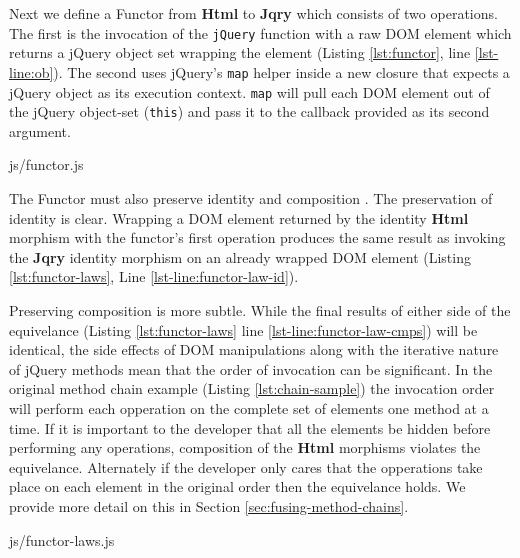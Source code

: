 \documentclass[preprint, leqno]{sigplanconf}
\begin{document}
Next we define a Functor from \textbf{Html} to \textbf{Jqry} which consists of two operations. The first is the invocation of the \verb|jQuery| function with a raw DOM element which returns a jQuery object set wrapping the element (Listing \ref{lst:functor}, line \ref{lst-line:ob}). The second uses jQuery's \verb|map| helper inside a new closure that expects a jQuery object as its execution context. \verb|map| will pull each DOM element out of the jQuery object-set (\verb|this|) and pass it to the callback provided as its second argument.

\begin{bottom}
\begin{lstinputlisting}[
    language=JavaScript,
    caption={Functor from Html to Jqry},
    label={lst:functor},
    escapeinside={@}{@}
]{js/functor.js}
\end{lstinputlisting}
\end{bottom}

The Functor must also preserve identity and composition \cite[p. ~36]{bib:category-definition}. The preservation of identity is clear. Wrapping a DOM element returned by the identity \textbf{Html} morphism with the functor's first operation produces the same result as invoking the \textbf{Jqry} identity morphism on an already wrapped DOM element (Listing \ref{lst:functor-laws}, Line \ref{lst-line:functor-law-id}).

Preserving composition is more subtle. While the final results of either side of the equivelance (Listing \ref{lst:functor-laws} line \ref{lst-line:functor-law-cmps}) will be identical, the side effects of DOM manipulations along with the iterative nature of jQuery methods mean that the order of invocation can be significant. In the original method chain example (Listing \ref{lst:chain-sample}) the invocation order will perform each opperation on the complete set of elements one method at a time.  If it is important to the developer that all the elements be hidden before performing any operations, composition of the \textbf{Html} morphisms violates the equivelance. Alternately if the developer only cares that the opperations take place on each element in the original order then the equivelance holds. We provide more detail on this in Section \ref{sec:fusing-method-chains}.

\begin{bottom}
\begin{lstinputlisting}[
    language=JavaScript,
    caption={Satisfying the Functor Laws},
    label={lst:functor-laws},
    escapeinside={@}{@}
]{js/functor-laws.js}
\end{lstinputlisting}
\end{bottom}
\end{document}
